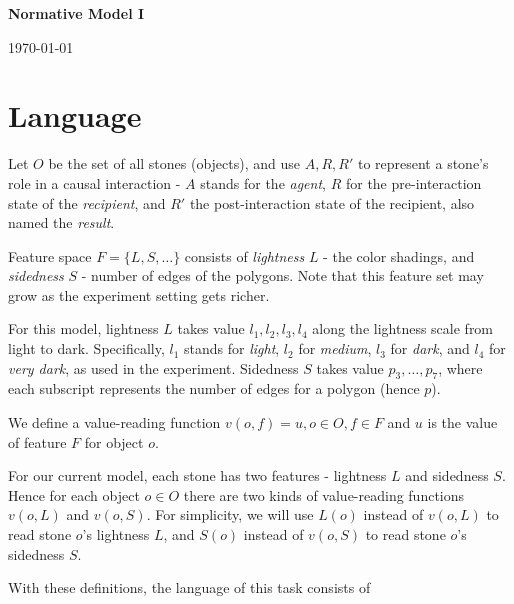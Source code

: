 \documentclass[11pt]{article}
\begin{document}

\begin{center}
{\bf Normative Model I}

{\normalsize \today}
\end{center}



\section*{Language}

Let $O$ be the set of all stones (objects),
and use $A, R, R'$ to represent a stone's role in a causal interaction - 
	$A$ stands for the \textit{agent}, 
	$R$ for the pre-interaction state of the \textit{recipient}, 
	and $R'$ the post-interaction state of the recipient, also named the \textit{result}.

Feature space $F = \{ L, S, \ldots \}$ consists of
	\textit{lightness} $L$ - the color shadings,
	and \textit{sidedness} $S$ - number of edges of the polygons.
	Note that this feature set may grow as the experiment setting gets richer.

For this model, 
	lightness $L$ takes value $l_1, l_2, l_3, l_4$ along the lightness scale from light to dark. 
	Specifically, 
		$l_1$ stands for \textit{light}, 
		$l_2$ for \textit{medium}, 
		$l_3$ for \textit{dark}, and 
		$l_4$ for \textit{very dark}, as used in the experiment.
	Sidedness $S$ takes value $p_3, \ldots, p_7$, 
		where each subscript represents the number of edges for a polygon (hence $p$).

We define a value-reading function $v(o, f) = u, o \in O, f \in F$ and $u$ is the value of feature $F$ for object $o$.

For our current model, each stone has two features - lightness $L$ and sidedness $S$.
Hence for each object $o \in O$ there are two kinds of value-reading functions $v(o, L)$ and $v(o, S)$.
For simplicity, we will use $L(o)$ instead of $v(o, L)$ to read stone $o$'s lightness $L$,
	and $S(o)$ instead of $v(o, S)$ to read stone $o$'s sidedness $S$.



With these definitions, the language of this task consists of
\end{document}
